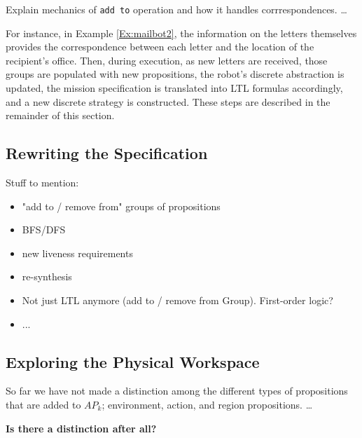 Explain mechanics of \texttt{add to} operation and how it handles corrrespondences. \ldots

For instance, in Example \ref{Ex:mailbot2}, the information on the letters themselves provides the correspondence between each letter and the location of the recipient's office. Then, during execution, as new letters are received, those groups are populated with new propositions, the robot's discrete abstraction is updated, the mission specification is translated into LTL formulas accordingly, and a new discrete strategy is constructed. These steps are described in the remainder of this section.

\subsection{Rewriting the Specification} %

Stuff to mention:
\begin{itemize}
	\item "add to / remove from" groups of propositions
	\item BFS/DFS
	\item new liveness requirements
	\item re-synthesis
	\item Not just LTL anymore (add to / remove from Group). First-order logic?
	\item ...
\end{itemize}

\subsection{Exploring the Physical Workspace}

So far we have not made a distinction among the different types of propositions that are added to $AP_k$; environment, action, and region propositions. \ldots

\textbf{Is there a distinction after all?}


